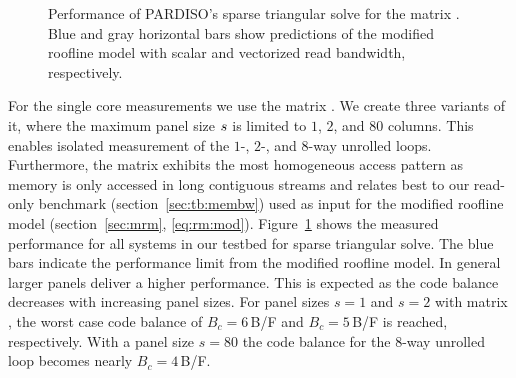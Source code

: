 \begin{figure}[tp]
{\label{fig:p:single-core:zen-s}
} %
  \caption{Performance of PARDISO's sparse triangular solve
    for the matrix . %
    Blue and gray horizontal bars show predictions of the modified roofline model 
    with scalar and vectorized read bandwidth, respectively.
    }%
  \label{fig:p:single-core}%
\end{figure}


For the single core measurements we use the matrix .
We create three variants of it, where the maximum panel size $s$ is
limited to $1$, $2$, and $80$ columns.
This enables isolated measurement of the $1$-, $2$-, and $8$-way
unrolled loops.
Furthermore, the matrix  exhibits the most homogeneous access pattern
as memory is only accessed in long contiguous streams and relates best to our
read-only benchmark (section~\ref{sec:tb:membw}) used as input for the modified
roofline model (section~\ref{sec:mrm}, \eqref{eq:rm:mod}).
%
Figure~\ref{fig:p:single-core} shows the measured performance for all systems in
our testbed for sparse triangular solve.
The blue bars indicate the performance limit from the modified roofline model.
%
In general larger panels deliver a higher performance.
This is expected as the code balance decreases with increasing panel sizes.
For panel sizes $s=1$ and $s=2$ with matrix , the worst case code balance
of $B_c=6$\,B/F and $B_c=5$\,B/F is reached, respectively. 
With a panel size $s=80$ the code balance for the $8$-way unrolled loop
becomes nearly $B_c=4$\,B/F.
  
